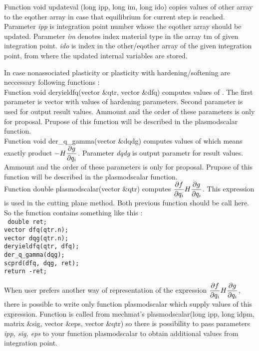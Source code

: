 Function {\sf void updateval (long ipp, long im, long ido)} copies values of {\sf other} array to
the eqother array in case that equilibrium for current step is reached. Parameter {\it ipp} is
integration point number whose the {\sf eqother} array should be updated. Parameter {\it im} denotes
index material type in the array {\sf tm} of given integration point. {\it ido} is index in the
{\sf other/eqother} array of the given integration point, from where the updated internal variables are stored.


In case nonassociated plasticity or plasticity with hardening/softening are neccessary following
functions :\\

Function {\sf void deryieldfq(vector \&qtr, vector \&dfq)} computes values of . The first
parameter is vector with values of hardening parameters. Second parameter is used for output result
values. Ammount and the order of these parameters is only for proposal. Prupose of this function will
be described in the {\sf plasmodscalar} function.\\

Function {\sf void der\_q\_gamma(vector \&dqdg)} computes values of  which means
exactly product $-H\mbox{$\displaystyle\frac{\partial{g}}{\partial{q_i}}$}$. Parameter {\it dqdg} is output parametr for result values.
Ammount and the order of these parameters is only for proposal. Prupose of this function will be
described in the {\sf plasmodscalar} function.\\

Function {\sf double plasmodscalar(vector \&qtr)} computes $\mbox{$\displaystyle\frac{\partial{f}}{\partial{q_i}}$}H\mbox{$\displaystyle\frac{\partial{g}}{\partial{q_i}}$}$. This expression
is used in the cutting plane method. Both previous function should be call here. So the function
contains something like this :\\
{\tt
  double ret;\\
  vector dfq(qtr.n);\\
  vector dqg(qtr.n);\\
  deryieldfq(qtr, dfq);\\
  der\_q\_gamma(dqg);\\
  scprd(dfq, dqg, ret);\\
  return -ret;
}

When user prefers another way of representation of the expression $\mbox{$\displaystyle\frac{\partial{f}}{\partial{q_i}}$}H\mbox{$\displaystyle\frac{\partial{g}}{\partial{q_i}}$}$, there
is possible to write only function {\sf plasmodscalar} which supply values of this expression. Function
is called from mechmat's {\sf plasmodscalar(long ipp, long idpm, matrix \&sig, vector \&eps, vector \&qtr)} 
so there is possibility to pass parameters {\it ipp, sig, eps} to your function {\sf plasmodscalar} to obtain 
additional values from integration point.\\

